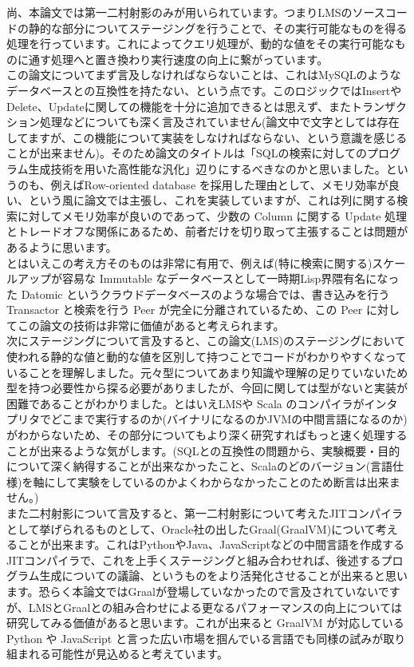 \documentclass[a4paper, dvipdfmx, 12pt]{article}
\begin{document}
尚、本論文では第一二村射影のみが用いられています。つまりLMSのソースコードの静的な部分についてステージングを行うことで、その実行可能なものを得る処理を行っています。これによってクエリ処理が、動的な値をその実行可能なものに通す処理へと置き換わり実行速度の向上に繋がっています。\\

この論文についてまず言及しなければならないことは、これはMySQLのようなデータベースとの互換性を持たない、という点です。このロジックではInsertやDelete、Updateに関しての機能を十分に追加できるとは思えず、またトランザクション処理などについても深く言及されていません(論文中で文字としては存在してますが、この機能について実装をしなければならない、という意識を感じることが出来ません)。そのため論文のタイトルは「SQLの検索に対してのプログラム生成技術を用いた高性能な汎化」辺りにするべきなのかと思いました。というのも、例えばRow-oriented database を採用した理由として、メモリ効率が良い、という風に論文では主張し、これを実装していますが、これは列に関する検索に対してメモリ効率が良いのであって、少数の Column に関する Update 処理とトレードオフな関係にあるため、前者だけを切り取って主張することは問題があるように思います。\\

とはいえこの考え方そのものは非常に有用で、例えば(特に検索に関する)スケールアップが容易な Immutable なデータベースとして一時期Lisp界隈有名になった Datomic というクラウドデータベースのような場合では、書き込みを行うTransactor と検索を行う Peer が完全に分離されているため、この Peer に対してこの論文の技術は非常に価値があると考えられます。\\

次にステージングについて言及すると、この論文(LMS)のステージングにおいて使われる静的な値と動的な値を区別して持つことでコードがわかりやすくなっていることを理解しました。元々型についてあまり知識や理解の足りていないため型を持つ必要性から探る必要がありましたが、今回に関しては型がないと実装が困難であることがわかりました。とはいえLMSや Scala のコンパイラがインタプリタでどこまで実行するのか(バイナリになるのかJVMの中間言語になるのか)がわからないため、その部分についてもより深く研究すればもっと速く処理することが出来るような気がします。(SQLとの互換性の問題から、実験概要・目的について深く納得することが出来なかったこと、Scalaのどのバージョン(言語仕様)を軸にして実験をしているのかよくわからなかったことのため断言は出来ません。)\\

また二村射影について言及すると、第一二村射影について考えたJITコンパイラとして挙げられるものとして、Oracle社の出したGraal(GraalVM)について考えることが出来ます。これはPythonやJava、JavaScriptなどの中間言語を作成するJITコンパイラで、これを上手くステージングと組み合わせれば、後述するプログラム生成についての議論、というものをより活発化させることが出来ると思います。恐らく本論文ではGraalが登場していなかったので言及されていないですが、LMSとGraalとの組み合わせによる更なるパフォーマンスの向上については研究してみる価値があると思います。これが出来ると GraalVM が対応している Python や JavaScript と言った広い市場を掴んでいる言語でも同様の試みが取り組まれる可能性が見込めると考えています。\\
\end{document}

